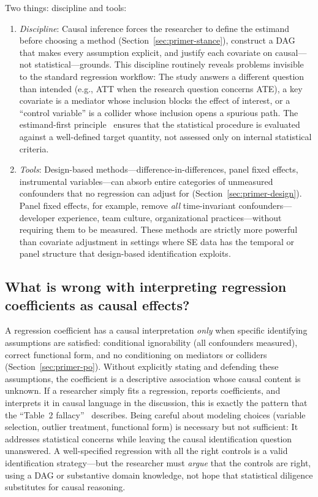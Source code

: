 Two things: discipline and tools:
\begin{enumerate}[leftmargin=15pt]
    \item \emph{Discipline}:
    Causal inference forces the researcher to define the estimand before choosing a method (Section~\ref{sec:primer-stance}), construct a DAG that makes every assumption explicit, and justify each covariate on causal---not statistical---grounds.
    This discipline routinely reveals problems invisible to the standard regression workflow: The study answers a different question than intended (e.g., ATT when the research question concerns ATE), a key covariate is a mediator whose inclusion blocks the effect of interest, or a ``control variable'' is a collider whose inclusion opens a spurious path.
    The estimand-first principle~\cite{lundberg2021estimand} ensures that the statistical procedure is evaluated against a well-defined target quantity, not assessed only on internal statistical criteria.
    \item \emph{Tools}:
    Design-based methods---difference-in-differences, panel fixed effects, instrumental variables---can absorb entire categories of unmeasured confounders that no regression can adjust for (Section~\ref{sec:primer-design}).
    Panel fixed effects, for example, remove \emph{all} time-invariant confounders---developer experience, team culture, organizational practices---without requiring them to be measured.
    These methods are strictly more powerful than covariate adjustment in settings where SE data has the temporal or panel structure that design-based identification exploits.
\end{enumerate}

\subsection{What is wrong with interpreting regression coefficients as causal effects?}

A regression coefficient has a causal interpretation \emph{only} when specific identifying assumptions are satisfied: conditional ignorability (all confounders measured), correct functional form, and no conditioning on mediators or colliders (Section~\ref{sec:primer-po}).
Without explicitly stating and defending these assumptions, the coefficient is a descriptive association whose causal content is unknown.
If a researcher simply fits a regression, reports coefficients, and interprets it in causal language in the discussion, this is exactly the pattern that the ``Table~2 fallacy''~\cite{westreich2013table2} describes.
Being careful about modeling choices (variable selection, outlier treatment, functional form) is necessary but not sufficient: It addresses statistical concerns while leaving the causal identification question unanswered.
A well-specified regression with all the right controls is a valid identification strategy---but the researcher must \emph{argue} that the controls are right, using a DAG or substantive domain knowledge, not hope that statistical diligence substitutes for causal reasoning.

